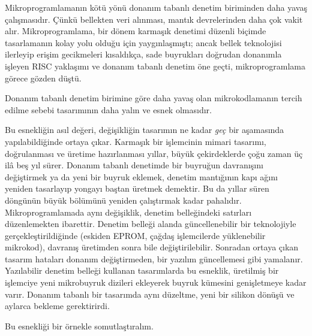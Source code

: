 Mikroprogramlamanın kötü yönü donanım tabanlı denetim biriminden daha yavaş çalışmasıdır. Çünkü bellekten veri alınması, mantık devrelerinden daha çok vakit alır. Mikroprogramlama, bir dönem karmaşık denetimi düzenli biçimde tasarlamanın kolay yolu olduğu için yaygınlaşmıştı; ancak bellek teknolojisi ilerleyip erişim gecikmeleri kısaldıkça, sade buyrukları doğrudan donanımla işleyen RISC yaklaşımı ve donanım tabanlı denetim öne geçti, mikroprogramlama görece gözden düştü.

Donanım tabanlı denetim birimine göre daha yavaş olan mikrokodlamanın tercih edilme sebebi tasarımının daha yalın ve esnek olmasıdır.

Bu esnekliğin asıl değeri, değişikliğin tasarımın ne kadar \emph{geç} bir aşamasında yapılabildiğinde ortaya çıkar. Karmaşık bir işlemcinin mimari tasarımı, doğrulanması ve üretime hazırlanması yıllar, büyük çekirdeklerde çoğu zaman üç ilâ beş yıl sürer. Donanım tabanlı denetimde bir buyruğun davranışını değiştirmek ya da yeni bir buyruk eklemek, denetim mantığının kapı ağını yeniden tasarlayıp yongayı baştan üretmek demektir. Bu da yıllar süren döngünün büyük bölümünü yeniden çalıştırmak kadar pahalıdır. Mikroprogramlamada aynı değişiklik, denetim belleğindeki satırları düzenlemekten ibarettir. Denetim belleği alanda güncellenebilir bir teknolojiyle gerçekleştirildiğinde (eskiden EPROM, çağdaş işlemcilerde yüklenebilir mikrokod), davranış üretimden sonra bile değiştirilebilir. Sonradan ortaya çıkan tasarım hataları donanım değiştirmeden, bir yazılım güncellemesi gibi yamalanır. Yazılabilir denetim belleği kullanan tasarımlarda bu esneklik, üretilmiş bir işlemciye yeni mikrobuyruk dizileri ekleyerek buyruk kümesini genişletmeye kadar varır. Donanım tabanlı bir tasarımda aynı düzeltme, yeni bir silikon dönüşü ve aylarca bekleme gerektirirdi.

Bu esnekliği bir örnekle somutlaştıralım.


